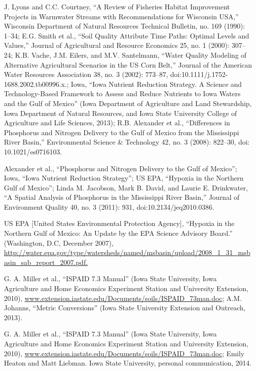 \documentclass[11pt]{article}
\begin{document}
\begin{thebibliography}{1}
   J. Lyons and C.C. Courtney, “A Review of Fisheries Habitat Improvement Projects in Warmwater Streams with Recommendations for Wisconsin USA,” Wisconsin Department of Natural Resources Technical Bulletin, no. 169 (1990): 1–34; E.G. Smith et al., “Soil Quality Attribute Time Paths: Optimal Levels and Values,” Journal of Agricultural and Resource Economics 25, no. 1 (2000): 307–24; K.B. Vache, J.M. Eilers, and M.V. Santelmann, “Water Quality Modeling of Alternative Agricultural Scenarios in the US Corn Belt,” Journal of the American Water Resources Association 38, no. 3 (2002): 773–87, doi:10.1111/j.1752-1688.2002.tb00996.x.; Iowa, “Iowa Nutrient Reduction Strategy. A Science and Technology-Based Framework to Assess and Reduce Nutrients to Iowa Waters and the Gulf of Mexico” (Iowa Department of Agriculture and Land Stewardship, Iowa Department of Natural Resources, and Iowa State University College of Agriculture and Life Sciences, 2013); R.B. Alexander et al., “Differences in Phosphorus and Nitrogen Delivery to the Gulf of Mexico from the Mississippi River Basin,” Environmental Science & Technology 42, no. 3 (2008): 822–30, doi: 10.1021/es0716103.
   
   Alexander et al., “Phosphorus and Nitrogen Delivery to the Gulf of Mexico”; Iowa, “Iowa Nutrient Reduction Strategy”; US EPA, “Hypoxia in the Northern Gulf of Mexico”; Linda M. Jacobson, Mark B. David, and Laurie E. Drinkwater, “A Spatial Analysis of Phosphorus in the Mississippi River Basin,” Journal of Environment Quality 40, no. 3 (2011): 931, doi:10.2134/jeq2010.0386.
   
   US EPA [United States Environmental Protection Agency], “Hypoxia in the Northern Gulf of Mexico: An Update by the EPA Science Advisory Board.” (Washington, D.C, December 2007), \url{http://water.epa.gov/type/watersheds/named/msbasin/upload/2008_1_31_msbasin_sab_report_2007.pdf.}
   
   G. A. Miller et al., “ISPAID 7.3 Manual” (Iowa State University, Iowa Agriculture and Home Economics Experiment Station and University Extension, 2010), \url{www.extension.iastate.edu/Documents/soils/ISPAID_73man.doc}; A.M. Johanns, “Metric Conversions” (Iowa State University Extension and Outreach, 2013).
   
    G. A. Miller et al., “ISPAID 7.3 Manual” (Iowa State University, Iowa Agriculture and Home Economics Experiment Station and University Extension, 2010), \url{www.extension.iastate.edu/Documents/soils/ISPAID_73man.doc}; Emily Heaton and Matt Liebman. Iowa State University, personal communication, 2014.
   

\end{thebibliography}
\end{document}
